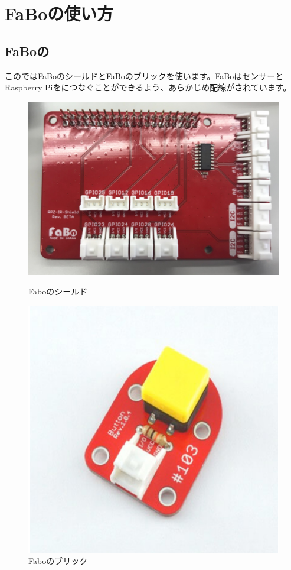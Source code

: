 \section{FaBoの使い方}
\subsection{FaBoの}
このではFaBoのシールドとFaBoのブリックを使います。FaBoはセンサーとRaspberry Piをにつなぐことができるよう、あらかじめ配線がされています。

\begin{figure}[htbp]
  \begin{minipage}[b]{0.45\linewidth}
    \centering
    \includegraphics[keepaspectratio, scale=0.6]{images/chap05/text05-img004.png}
    \caption{Faboのシールド}
    \label{fig4}
  \end{minipage}
  \begin{minipage}[b]{0.45\linewidth}
    \centering
    \includegraphics[keepaspectratio, scale=0.6]{images/chap05/text05-img005.png}
    \caption{Faboのブリック}
    \label{fig5}
  \end{minipage}
\end{figure}

